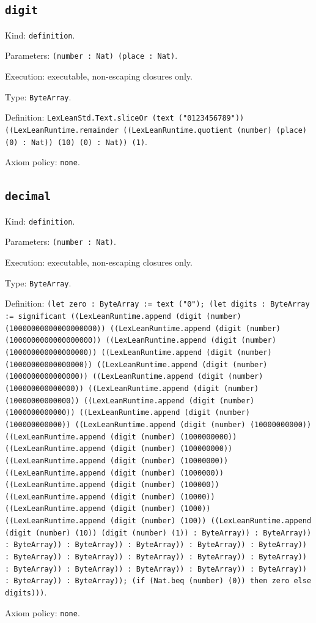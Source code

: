 \documentclass[11pt]{article}
\begin{document}
\subsection*{\texttt{digit}}
\noindent Kind: \texttt{definition}.\par
\noindent Parameters: \texttt{(number : Nat) (place : Nat)}.\par
\noindent Execution: executable, non-escaping closures only.\par
\noindent Type: \texttt{ByteArray}.\par
\noindent Definition: \texttt{LexLeanStd.Text.sliceOr (text ("0123456789")) ((LexLeanRuntime.remainder ((LexLeanRuntime.quotient (number) (place) (0) : Nat)) (10) (0) : Nat)) (1)}.\par
\noindent Axiom policy: \texttt{none}.\par
\subsection*{\texttt{decimal}}
\noindent Kind: \texttt{definition}.\par
\noindent Parameters: \texttt{(number : Nat)}.\par
\noindent Execution: executable, non-escaping closures only.\par
\noindent Type: \texttt{ByteArray}.\par
\noindent Definition: \texttt{(let zero : ByteArray := text ("0"); (let digits : ByteArray := significant ((LexLeanRuntime.append (digit (number) (10000000000000000000)) ((LexLeanRuntime.append (digit (number) (1000000000000000000)) ((LexLeanRuntime.append (digit (number) (100000000000000000)) ((LexLeanRuntime.append (digit (number) (10000000000000000)) ((LexLeanRuntime.append (digit (number) (1000000000000000)) ((LexLeanRuntime.append (digit (number) (100000000000000)) ((LexLeanRuntime.append (digit (number) (10000000000000)) ((LexLeanRuntime.append (digit (number) (1000000000000)) ((LexLeanRuntime.append (digit (number) (100000000000)) ((LexLeanRuntime.append (digit (number) (10000000000)) ((LexLeanRuntime.append (digit (number) (1000000000)) ((LexLeanRuntime.append (digit (number) (100000000)) ((LexLeanRuntime.append (digit (number) (10000000)) ((LexLeanRuntime.append (digit (number) (1000000)) ((LexLeanRuntime.append (digit (number) (100000)) ((LexLeanRuntime.append (digit (number) (10000)) ((LexLeanRuntime.append (digit (number) (1000)) ((LexLeanRuntime.append (digit (number) (100)) ((LexLeanRuntime.append (digit (number) (10)) (digit (number) (1)) : ByteArray)) : ByteArray)) : ByteArray)) : ByteArray)) : ByteArray)) : ByteArray)) : ByteArray)) : ByteArray)) : ByteArray)) : ByteArray)) : ByteArray)) : ByteArray)) : ByteArray)) : ByteArray)) : ByteArray)) : ByteArray)) : ByteArray)) : ByteArray)) : ByteArray)); (if (Nat.beq (number) (0)) then zero else digits)))}.\par
\noindent Axiom policy: \texttt{none}.\par
\end{document}
